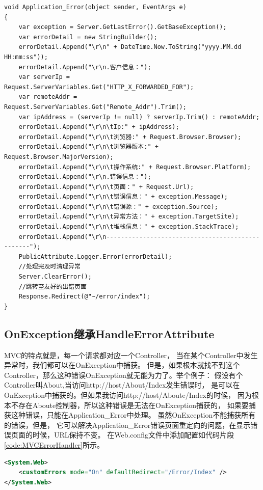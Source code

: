 \documentclass{book}
\begin{document}
\begin{lstlisting}[language={[Sharp]C},caption=MVC应用程序级别错误处理,label=code:ApplicationLevelErrorHandler]
void Application_Error(object sender, EventArgs e)
{     
    var exception = Server.GetLastError().GetBaseException();
    var errorDetail = new StringBuilder();
    errorDetail.Append("\r\n" + DateTime.Now.ToString("yyyy.MM.dd HH:mm:ss"));
    errorDetail.Append("\r\n.客户信息：");
    var serverIp = Request.ServerVariables.Get("HTTP_X_FORWARDED_FOR");
    var remoteAddr = Request.ServerVariables.Get("Remote_Addr").Trim();
    var ipAddress = (serverIp != null) ? serverIp.Trim() : remoteAddr;
    errorDetail.Append("\r\n\tIp:" + ipAddress);
    errorDetail.Append("\r\n\t浏览器:" + Request.Browser.Browser);
    errorDetail.Append("\r\n\t浏览器版本:" + Request.Browser.MajorVersion);
    errorDetail.Append("\r\n\t操作系统:" + Request.Browser.Platform);
    errorDetail.Append("\r\n.错误信息：");
    errorDetail.Append("\r\n\t页面：" + Request.Url);
    errorDetail.Append("\r\n\t错误信息：" + exception.Message);
    errorDetail.Append("\r\n\t错误源：" + exception.Source);
    errorDetail.Append("\r\n\t异常方法：" + exception.TargetSite);
    errorDetail.Append("\r\n\t堆栈信息：" + exception.StackTrace);
    errorDetail.Append("\r\n-------------------------------------------------");
    PublicAttribute.Logger.Error(errorDetail);
    //处理完及时清理异常 
    Server.ClearError();
    //跳转至友好的出错页面 
    Response.Redirect(@"~/error/index");
}
\end{lstlisting}

\subsection{OnException继承HandleErrorAttribute}

MVC的特点就是，每一个请求都对应一个Controller，
当在某个Controller中发生异常时，我们都可以在OnException中捕获。
但是，如果根本就找不到这个Controller，那么这种错误OnException就无能为力了。举个例子：
假设有个Controller叫About,当访问http://host/About/Index发生错误时，
是可以在OnException中捕获的。但如果我访问http://host/Aboute/Index的时候，
因为根本不存在Aboute控制器，所以这种错误是无法在OnException捕获的，
如果要捕获这种错误，只能在Application\_Error中处理。
虽然OnException不能捕获所有的错误，但是，
它可以解决Application\_Error错误页面重定向的问题，在显示错误页面的时候，URL保持不变。
在Web.config文件中添加配置如代码片段\ref{code:MVCErrorHandler}所示。

\begin{lstlisting}[language=XML,caption=配置MVC错误处理页面,label=code:MVCErrorHandler]
<System.Web>
	<customErrors mode="On" defaultRedirect="/Error/Index" />
</System.Web>
\end{lstlisting}
\end{document}

